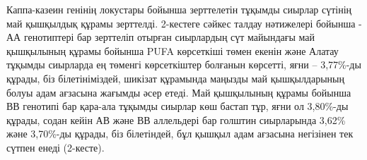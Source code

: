 \begin{multicols}{2}
Каппа-казеин генінің локустары бойынша зерттелетін тұқымды сиырлар
сүтінің май қышқылдық құрамы зерттелді. 2-кестеге сәйкес талдау
нәтижелері бойынша - АА генотиптері бар зерттеліп отырған сиырлардың сүт
майындағы май қышқылының құрамы бойынша PUFA көрсеткіші төмен екенін
және Алатау тұқымды сиырларда ең төменгі көрсеткіштер болғанын көрсетті,
яғни -- 3,77\%-ды құрады, біз білетініміздей, шикізат құрамында маңызды
май қышқылдарының болуы адам ағзасына жағымды әсер етеді. Май қышқылының
құрамы бойынша ВВ генотипі бар қара-ала тұқымды сиырлар көш бастап тұр,
яғни ол 3,80\%-ды құрады, содан кейін АВ және ВВ аллельдері бар голштин
сиырларында 3,62\% және 3,70\%-ды құрады, біз білетіндей, бұл қышқыл
адам ағзасына негізінен тек сүтпен енеді (2-кесте).
\end{multicols}


\begin{table}[]
  \centering
  \caption*{1-кесте -- Зерттелген сиырлардағы каппа-казеин генінің генотиптері мен аллельдерінің кездесу жиілігі}
\end{table}
